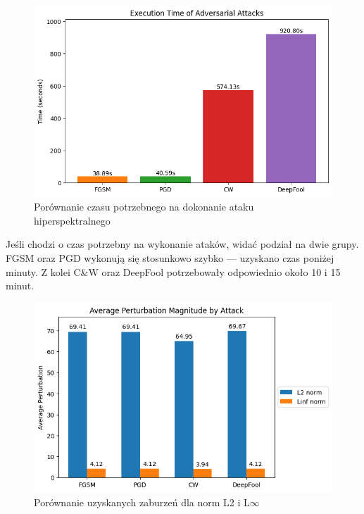 \documentclass[12pt]{article}
\begin{document}
\begin{figure}[H]
    \centering
    \includegraphics[width=1\textwidth]{hybridsn_time.png} 
    \caption{Porównanie czasu potrzebnego na dokonanie ataku hiperspektralnego}
\end{figure}

Jeśli chodzi o czas potrzebny na wykonanie ataków, widać podział na dwie grupy. FGSM oraz PGD wykonują się stosunkowo szybko — uzyskano czas poniżej minuty. Z kolei C\&W oraz DeepFool potrzebowały odpowiednio około 10 i 15 minut.

\begin{figure}[H]
    \centering
    \includegraphics[width=1\textwidth]{perturbations.png} 
    \caption{Porównanie uzyskanych zaburzeń dla norm L2 i L$\infty$}
\end{figure}
\end{document}
